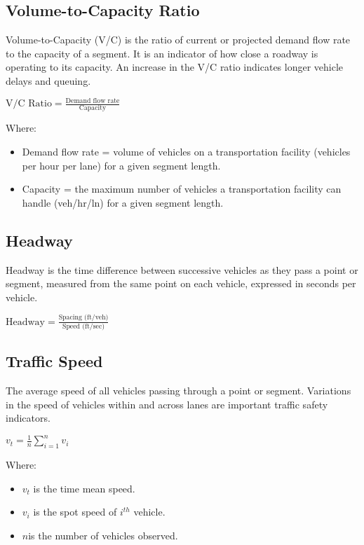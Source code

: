 	\subsection{Volume-to-Capacity Ratio}
		Volume-to-Capacity (V/C) is the ratio of current or projected demand flow rate to the capacity of a segment. It is an indicator of how close a roadway is operating to its capacity. An increase in the V/C ratio indicates longer vehicle delays and queuing.
		
		\( \text{V/C Ratio}=\frac{\text{Demand flow rate}}{\text{Capacity}} \)
		
		Where:
		\begin{itemize}
			\item Demand flow rate = volume of vehicles on a transportation facility (vehicles per hour per lane) for a given segment length.
			\item Capacity = the maximum number of vehicles a transportation facility can handle (veh/hr/ln) for a given segment length.
		\end{itemize}
	
	\subsection{Headway}
		Headway is the time difference between successive vehicles as they pass a point or segment, measured from the same point on each vehicle, expressed in seconds per vehicle.
		
		\( \text{Headway}=\frac{\text{Spacing (ft/veh)}}{\text{Speed (ft/sec)}} \)
		
	\subsection{Traffic Speed}
		The average speed of all vehicles passing through a point or segment. Variations in the speed of vehicles within and across lanes are important traffic safety indicators.
		
		\( v_t=\frac{1}{n}\sum^{n}_{i=1}{v_i} \)
		
		Where:
		\begin{itemize}
			\item \( v_t \) is the time mean speed.
			\item \( v_i \) is the spot speed of \(i^{th} \) vehicle.
			\item \( n \)is the number of vehicles observed.
		\end{itemize}
		
	
